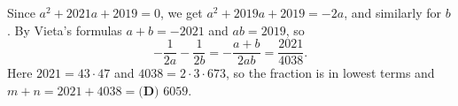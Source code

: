 Since $a^2+2021a+2019=0$, we get $a^2+2019a+2019=-2a$, and similarly for $b$. By Vieta's formulas $a+b=-2021$ and $ab=2019$, so
\[-\dfrac{1}{2a}-\dfrac{1}{2b}=-\dfrac{a+b}{2ab}=\dfrac{2021}{4038}.\]
Here $2021=43\cdot47$ and $4038=2\cdot3\cdot673$, so the fraction is in lowest terms and $m+n=2021+4038=\boxed{\textbf{(D) }6059}$.
